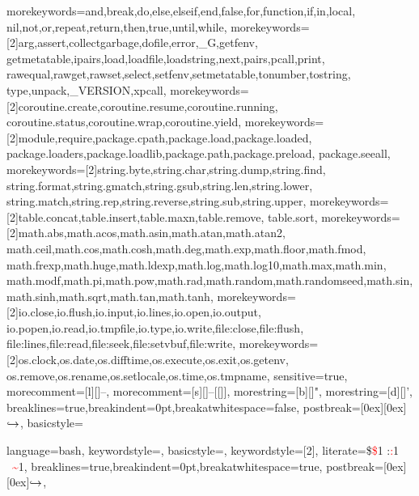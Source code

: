 
  {morekeywords={and,break,do,else,elseif,end,false,for,function,if,in,local,
     nil,not,or,repeat,return,then,true,until,while},
   morekeywords={[2]arg,assert,collectgarbage,dofile,error,_G,getfenv,
     getmetatable,ipairs,load,loadfile,loadstring,next,pairs,pcall,print,
     rawequal,rawget,rawset,select,setfenv,setmetatable,tonumber,tostring,
     type,unpack,_VERSION,xpcall},
   morekeywords={[2]coroutine.create,coroutine.resume,coroutine.running,
     coroutine.status,coroutine.wrap,coroutine.yield},
   morekeywords={[2]module,require,package.cpath,package.load,package.loaded,
     package.loaders,package.loadlib,package.path,package.preload,
     package.seeall},
   morekeywords={[2]string.byte,string.char,string.dump,string.find,
     string.format,string.gmatch,string.gsub,string.len,string.lower,
     string.match,string.rep,string.reverse,string.sub,string.upper},
   morekeywords={[2]table.concat,table.insert,table.maxn,table.remove,
   table.sort},
   morekeywords={[2]math.abs,math.acos,math.asin,math.atan,math.atan2,
     math.ceil,math.cos,math.cosh,math.deg,math.exp,math.floor,math.fmod,
     math.frexp,math.huge,math.ldexp,math.log,math.log10,math.max,math.min,
     math.modf,math.pi,math.pow,math.rad,math.random,math.randomseed,math.sin,
     math.sinh,math.sqrt,math.tan,math.tanh},
   morekeywords={[2]io.close,io.flush,io.input,io.lines,io.open,io.output,
     io.popen,io.read,io.tmpfile,io.type,io.write,file:close,file:flush,
     file:lines,file:read,file:seek,file:setvbuf,file:write},
   morekeywords={[2]os.clock,os.date,os.difftime,os.execute,os.exit,os.getenv,
     os.remove,os.rename,os.setlocale,os.time,os.tmpname},
   sensitive=true,
   morecomment=[l][\color{Magenta}]{--},
   morecomment=[s][\color{Magenta}]{--[[}{]]},
   morestring=[b][\color{Blue}]",
   morestring=[d][\color{Blue}]',
   breaklines=true,breakindent=0pt,breakatwhitespace=false,
   postbreak=\raisebox{0ex}[0ex][0ex]{\ensuremath{\color{black}\hookrightarrow\space}},
   basicstyle=\ttfamily\small
}

{language=bash,
  keywordstyle=\color{Blue},
  basicstyle=\ttfamily\small,
  keywordstyle=[2]{\color{Red}},
  literate={\$}{{\textcolor{Red}{\$}}}1 
         {:}{{\textcolor{Red}{:}}}1
         {~}{{\textcolor{Red}{\textasciitilde}}}1,
  breaklines=true,breakindent=0pt,breakatwhitespace=true,
  postbreak=\raisebox{0ex}[0ex][0ex]{\ensuremath{\color{black}\hookrightarrow\space}},
}
